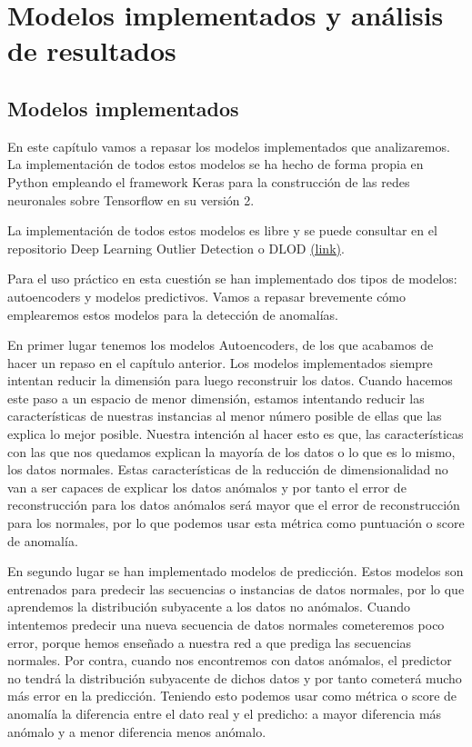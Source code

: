 \part{Modelos implementados y análisis de resultados}
\label{part:explicacionmodelos_analisisrresultados}

\chapter{Modelos implementados}
\label{chapter:modelos}

En este capítulo vamos a repasar los modelos implementados que analizaremos. La implementación de todos estos modelos se ha hecho de forma propia en Python empleando el framework Keras para la construcción de las redes neuronales sobre Tensorflow en su versión 2.

La implementación de todos estos modelos es libre y se puede consultar en el repositorio Deep Learning Outlier Detection o DLOD \href{https://github.com/nacheteam/DLOD}{(link)}.

Para el uso práctico en esta cuestión se han implementado dos tipos de modelos: autoencoders y modelos predictivos. Vamos a repasar brevemente cómo emplearemos estos modelos para la detección de anomalías.

En primer lugar tenemos los modelos Autoencoders, de los que acabamos de hacer un repaso en el capítulo anterior. Los modelos implementados siempre intentan reducir la dimensión para luego reconstruir los datos. Cuando hacemos este paso a un espacio de menor dimensión, estamos intentando reducir las características de nuestras instancias al menor número posible de ellas que las explica lo mejor posible. Nuestra intención al hacer esto es que, las características con las que nos quedamos explican la mayoría de los datos o lo que es lo mismo, los datos normales. Estas características de la reducción de dimensionalidad no van a ser capaces de explicar los datos anómalos y por tanto el error de reconstrucción para los datos anómalos será mayor que el error de reconstrucción para los normales, por lo que podemos usar esta métrica como puntuación o score de anomalía.

En segundo lugar se han implementado modelos de predicción. Estos modelos son entrenados para predecir las secuencias o instancias de datos normales, por lo que aprendemos la distribución subyacente a los datos no anómalos. Cuando intentemos predecir una nueva secuencia de datos normales cometeremos poco error, porque hemos enseñado a nuestra red a que prediga las secuencias normales. Por contra, cuando nos encontremos con datos anómalos, el predictor no tendrá la distribución subyacente de dichos datos y por tanto cometerá mucho más error en la predicción. Teniendo esto podemos usar como métrica o score de anomalía la diferencia entre el dato real y el predicho: a mayor diferencia más anómalo y a menor diferencia menos anómalo.

